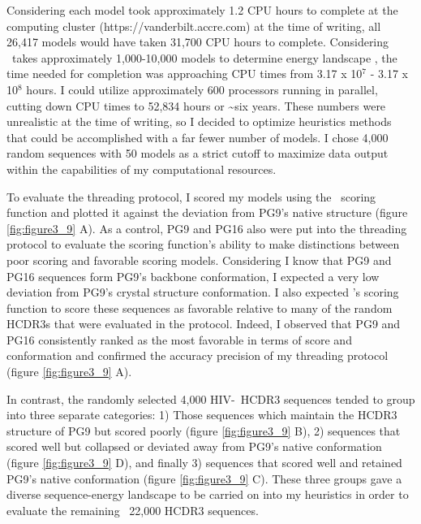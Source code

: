 Considering each model took approximately 1.2 CPU hours to complete at the computing cluster (https://vanderbilt.accre.com) at the time of writing, all 26,417 models would have taken 31,700 CPU hours to complete. Considering \rosetta~takes approximately 1,000-10,000 models to determine energy landscape \citep{Simons:1999wd,Bradley:2005bu,Bradley:2003db,Das:2007em,Raman:2009ht}, the time needed for completion was approaching CPU times from 3.17 x 10$^{7}$  - 3.17 x 10$^{8}$ hours. I could utilize approximately 600 processors running in parallel, cutting down CPU times to 52,834 hours or \textasciitilde six years. These numbers were unrealistic at the time of writing, so I decided to optimize heuristics methods that could be accomplished with a far fewer number of models. I chose 4,000 random sequences with 50 models as a strict cutoff to maximize data output within the capabilities of my computational resources.

To evaluate the threading protocol, I scored my models using the \rosetta~scoring function and plotted it against the deviation from PG9's native structure (figure \ref{fig:figure3_9} A). As a control, PG9 and PG16 also were put into the threading protocol to evaluate the scoring function's ability to make distinctions between poor scoring and favorable scoring models. Considering I know that PG9 and PG16 sequences form PG9's backbone conformation, I expected a very low deviation from PG9's crystal structure conformation. I also expected \rosetta's scoring function to score these sequences as favorable relative to many of the random HCDR3s that were evaluated in the protocol. Indeed, I observed that PG9 and PG16 consistently ranked as the most favorable in terms of score and conformation and confirmed the accuracy precision of my threading protocol (figure \ref{fig:figure3_9} A).

In contrast, the randomly selected 4,000 HIV-\naive~HCDR3 sequences tended to group into three separate categories: 1) Those sequences which maintain the HCDR3 structure of PG9 but scored poorly (figure \ref{fig:figure3_9} B), 2) sequences that scored well but collapsed or deviated away from PG9's native conformation (figure \ref{fig:figure3_9} D), and finally 3) sequences that scored well and retained PG9's native conformation (figure \ref{fig:figure3_9} C). These three groups gave a diverse sequence-energy landscape to be carried on into my heuristics in order to evaluate the remaining ~22,000 HCDR3 sequences.

